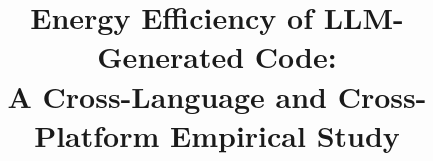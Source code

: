 \documentclass[conference]{IEEEtran}
\title{Energy Efficiency of LLM-Generated Code:\\
       A Cross-Language and Cross-Platform Empirical Study}
\author{%
  \IEEEauthorblockN{Brisild Capani}
  \IEEEauthorblockA{DHBW Stuttgart\\
    \texttt{inf24039@lehre.dhbw-stuttgart.de}}
}
\begin{document}
\maketitle












\FloatBarrier
\appendix

\end{document}
